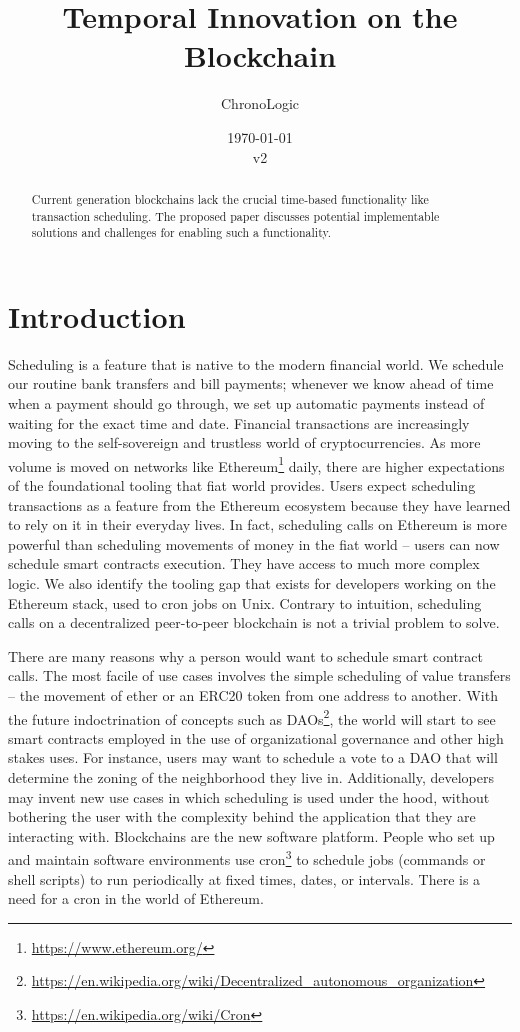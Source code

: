 \documentclass{report}
\title{Temporal Innovation on the Blockchain}
\author{ChronoLogic}
\date{\today\\v2}
\begin{document}
  \maketitle
  \begin{abstract}
    Current generation blockchains lack the crucial time-based functionality like transaction scheduling. The proposed paper discusses potential implementable solutions and challenges for enabling such a functionality.
  \end{abstract}
  \newpage
  \tableofcontents
  \newpage
  \chapter{Introduction}
  Scheduling is a feature that is native to the modern financial world.
  We schedule our routine bank transfers and bill payments; whenever we know ahead of time when a payment should go through, we set up automatic payments instead of waiting for the exact time and date. Financial transactions are increasingly moving to the self-sovereign and trustless world of cryptocurrencies. As more volume is moved on networks like Ethereum\footnote{\url{https://www.ethereum.org/}} daily, there are higher expectations of the foundational tooling that fiat world provides. Users expect scheduling transactions as a feature from the Ethereum ecosystem because they have learned to rely on it in their everyday lives. In fact, scheduling calls on Ethereum is more powerful than scheduling movements of money in the fiat world -- users can now schedule smart contracts execution. They have access to much more complex logic. We also identify the tooling gap that exists for developers working on the Ethereum stack, used to cron jobs on Unix. Contrary to intuition, scheduling calls on a decentralized peer-to-peer blockchain is not a trivial problem to solve.

  There are many reasons why a person would want to schedule smart contract calls. The most facile of use cases involves the simple scheduling of value transfers -- the movement of ether or an ERC20 token from one address to another. With the future indoctrination of concepts such as DAOs\footnote{\url{https://en.wikipedia.org/wiki/Decentralized_autonomous_organization}}, the world will start to see smart contracts employed in the use of organizational governance and other high stakes uses. For instance, users may want to schedule a vote to a DAO that will determine the zoning of the neighborhood they live in. Additionally, developers may invent new use cases in which scheduling is used under the hood, without bothering the user with the complexity behind the application that they are interacting with. Blockchains are the new software platform. People who set up and maintain software environments use cron\footnote{\url{https://en.wikipedia.org/wiki/Cron}} to schedule jobs (commands or shell scripts) to run periodically at fixed times, dates, or intervals. There is a need for a cron in the world of Ethereum.
\end{document}
